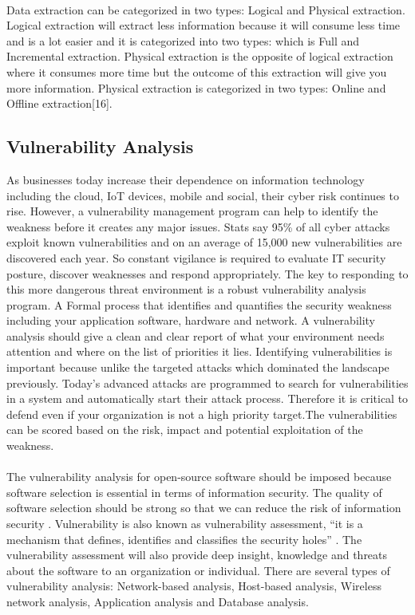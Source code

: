 \paragraph{}
Data extraction can be categorized in two types: Logical and Physical extraction. Logical extraction will extract less information because it will consume less time and is a lot easier and it is categorized into two types: which is Full and Incremental extraction. Physical extraction is the opposite of logical extraction where it consumes more time but the outcome of this extraction will give you more information. Physical extraction is categorized in two types: Online and Offline extraction[16].
%
\subsection{Vulnerability Analysis}
As businesses today increase their dependence on information technology including the cloud, IoT devices, mobile and social, their cyber risk continues to rise. However, a vulnerability management program can help to identify the weakness before it creates any major issues. Stats say 95\% of all cyber attacks exploit known vulnerabilities and on an average of 15,000 new vulnerabilities are discovered each year. So constant vigilance is required to evaluate IT security posture, discover weaknesses and respond appropriately. The key to responding to this more dangerous threat environment is a robust vulnerability analysis program. A Formal process that identifies and quantifies the security weakness including your application software, hardware and network. A vulnerability analysis should give a clean and clear report of what your environment needs attention and where on the list of priorities it lies. Identifying vulnerabilities is important  because unlike the targeted attacks which dominated the landscape previously. Today’s advanced attacks are programmed to search for vulnerabilities in a system and automatically start their attack process. Therefore it is critical to defend even if your organization is not a high priority target.The vulnerabilities can be scored based on the risk, impact and potential exploitation of the weakness.
\paragraph{}
The vulnerability analysis for open-source software should be imposed because software selection is essential in terms of information security. The quality of software selection should be strong so that we can reduce the risk of information security \cite{KeJaSa2005}. Vulnerability is also known as vulnerability assessment, “it is a mechanism that defines, identifies and classifies the security holes” \cite{KeJaSa2005}. The vulnerability assessment will also provide deep insight, knowledge and threats about the software to an organization or individual. There are several types of vulnerability analysis: Network-based analysis, Host-based analysis, Wireless network analysis, Application analysis and Database analysis.
